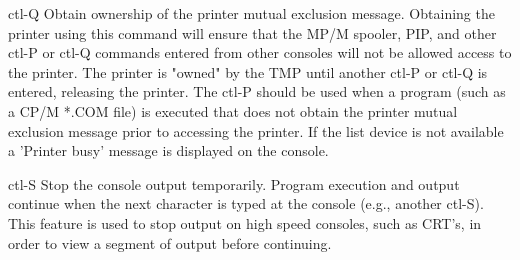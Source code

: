 	ctl-Q	Obtain ownership of the printer mutual exclusion
		message.  Obtaining the printer using this command
		will ensure that the MP/M spooler, PIP, and other
		ctl-P or ctl-Q commands entered from other
		consoles will not be allowed access to the
		printer.  The printer is "owned" by the TMP until
		another ctl-P or ctl-Q is entered, releasing the
		printer.  The ctl-P should be used when a program
		(such as a CP/M *.COM file) is executed that does
		not obtain the printer mutual exclusion message
		prior to accessing the printer.  If the list
		device is not available a 'Printer busy' message
		is displayed on the console.

	ctl-S	Stop the console output temporarily.  Program
		execution and output continue when the next
		character is typed at the console (e.g., another
		ctl-S).  This feature is used to stop output on
		high speed consoles, such as CRT's, in order to
		view a segment of output before continuing.

